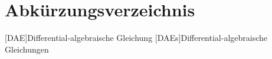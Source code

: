 \chapter*{Abk\"urzungsverzeichnis}
\begin{acronym}[DAE] %
	[DAE]{Differential-algebraische Gleichung}
	[DAEs]{Differential-algebraische Gleichungen}
\end{acronym}